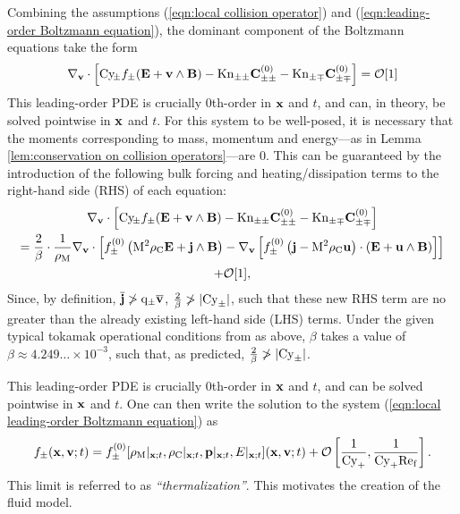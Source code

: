     Combining the assumptions (\ref{eqn:local collision operator}) and (\ref{eqn:leading-order Boltzmann equation}), the dominant component of the Boltzmann equations take the form
    \begin{equation}
        \nabla_{\mathbf{v}}\cdot\left[\mathrm{Cy}\!_{\pm}f_{\pm}(\mathbf{E} + \mathbf{v}\wedge\mathbf{B}) - \mathrm{Kn}_{\pm\pm}\mathbf{C}_{\pm\pm}^{(0)} - \mathrm{Kn}_{\pm\mp}\mathbf{C}_{\pm\mp}^{(0)}\right]  =  \mathcal{O}[1]
    \end{equation}
    This leading-order PDE is crucially 0th-order in $\mathbf{x}$ and $t$, and can, in theory, be solved pointwise in $\mathbf{x}$ and $t$. For this system to be well-posed, it is necessary that the moments corresponding to mass, momentum and energy---as in Lemma \ref{lem:conservation on collision operators}---are 0. This can be guaranteed by the introduction of the following bulk forcing and heating/dissipation terms to the right-hand side (RHS) of each equation:
    \begin{multline}\label{eqn:local leading-order Boltzmann equation}
        \nabla_{\mathbf{v}}\cdot\left[\mathrm{Cy}\!_{\pm}f_{\pm}(\mathbf{E} + \mathbf{v}\wedge\mathbf{B}) - \mathrm{Kn}_{\pm\pm}\mathbf{C}_{\pm\pm}^{(0)} - \mathrm{Kn}_{\pm\mp}\mathbf{C}_{\pm\mp}^{(0)}\right]  \\
        =  \frac{2}{\beta}\cdot\frac{1}{\rho_{\mathrm{M}}}\nabla_{\mathbf{v}}\cdot\left[f_{\pm}^{(0)}\left(\mathrm{M}^{2}\rho_{\mathrm{C}}\mathbf{E} + \mathbf{j}\wedge\mathbf{B}\right) - \nabla_{\mathbf{v}}\left[f_{\pm}^{(0)}\left(\mathbf{j} - \mathrm{M}^{2}\rho_{\mathrm{C}}\mathbf{u}\right)\cdot\left(\mathbf{E} + \mathbf{u}\wedge\mathbf{B}\right)\right]\right]  \\
        + \mathcal{O}[1],
    \end{multline}
    Since, by definition, $\overline{\mathbf{j}}  \ngtr  \mathrm{q}_{\pm}\overline{\mathbf{v}}$, $\frac{2}{\beta}  \ngtr  |\mathrm{Cy}_{\pm}|$, such that these new RHS term are no greater than the already existing left-hand side (LHS) terms.  Under the given typical tokamak operational conditions from \cite{Wes00} as above, $\beta$ takes a value of $\beta  \approx 4.249\ldots\times 10^{- 3}$, such that, as predicted, $\frac{2}{\beta}  \ngtr  |\mathrm{Cy}_{\pm}|$.
    
    This leading-order PDE is crucially 0th-order in $\mathbf{x}$ and $t$, and can be solved pointwise in $\mathbf{x}$ and $t$. One can then write the solution to the system (\ref{eqn:local leading-order Boltzmann equation}) as
    \begin{equation}\label{eqn:thermalization}
        f_{\pm}(\mathbf{x}, \mathbf{v}; t)  =  f_{\pm}^{(0)}[\rho_{\mathrm{M}}|_{\mathbf{x}; t}, \rho_{\mathrm{C}}|_{\mathbf{x}; t}, \mathbf{p}|_{\mathbf{x}; t}, E|_{\mathbf{x}; t}](\mathbf{x}, \mathbf{v}; t) + \mathcal{O}\left[\frac{1}{\mathrm{Cy}_{+}}, \frac{1}{\mathrm{Cy}_{+}\mathrm{Re}_{\mathrm{f}}}\right].
    \end{equation}
    This limit is referred to as \emph{``thermalization''}. This motivates the creation of the fluid model.

    
